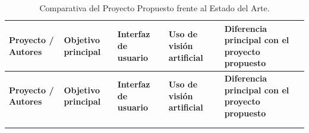 \clearpage
\begin{landscape}
\footnotesize
\setlength{\LTleft}{\fill}
\setlength{\LTright}{\fill}
\setlength{\LTcapwidth}{18.5cm}
\setlength{\tabcolsep}{4pt}
\renewcommand{\arraystretch}{1.18}
\begin{xltabular}{\linewidth}{|>{\raggedright\arraybackslash{}\hsize}X|>{\raggedright\arraybackslash{}\hsize}X|>{\raggedright\arraybackslash{}\hsize}X|>{\raggedright\arraybackslash{}\hsize}X|>{\raggedright\arraybackslash{}\hsize}X|}
\caption{Comparativa del Proyecto Propuesto frente al Estado del Arte.}\label{tab:comparativa}\\
\hline
{}
\textbf{Proyecto / Autores} & \textbf{Objetivo principal} & \textbf{Interfaz de usuario} & \textbf{Uso de visión artificial} & \textbf{Diferencia principal con el proyecto propuesto} \\ \hline
\endfirsthead

\hline
{}
\textbf{Proyecto / Autores} & \textbf{Objetivo principal} & \textbf{Interfaz de usuario} & \textbf{Uso de visión artificial} & \textbf{Diferencia principal con el proyecto propuesto} \\ \hline
\endhead

\hline
{} \\
\endfoot

\hline
\endlastfoot


\end{xltabular}
\end{landscape}
